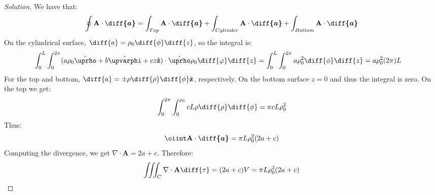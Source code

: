 \documentclass[crop=false,class=article,oneside]{standalone}
\begin{document}
        \begin{proof}[Solution]
            We have that:
            \begin{equation*}
                \oint\mathbf{A}\cdot\boldsymbol{\diff{a}}
                =\int_{Top}\mathbf{A}\cdot\boldsymbol{\diff{a}}
                +\int_{Cylinder}\mathbf{A}\cdot\boldsymbol{\diff{a}}
                +\int_{Bottom}\mathbf{A}\cdot\boldsymbol{\diff{a}}
            \end{equation*}
            On the cylindrical surface, 
            $\diff{a}=\rho_{0}\diff{\phi}\diff{z}$,
            so the integral is:
            \begin{align*}
                \int_{0}^{L}\int_{0}^{2\pi}
                (a\rho_0\hat{\boldsymbol{\uprho}}
                 +b\hat{\boldsymbol{\upvarphi}}
                 +cz\hat{\mathbf{z}})
                \cdot\hat{\boldsymbol{\uprho}}\rho_{0}
                \diff{\varphi}\diff{z}
                &=\int_{0}^{L}\int_{0}^{2\pi}a\rho_{0}^{2}
                \diff{\phi}\diff{z}
                =a\rho_0^{2}(2\pi)L    
            \end{align*}
            For the top and bottom,
            $\diff{a}%
             =\pm\rho\diff{\rho}\diff{\phi}\hat{\mathbf{z}}$,
            respectively. On the bottom surface $z=0$ and thus
            the integral is zero. On the top we get:
            \begin{equation*}
                \int_{0}^{2\pi}\int_{0}^{\rho_0}
                cL\rho\diff{\rho}\diff{\phi}
                =\pi cL\rho_0^{2}
            \end{equation*}
            Thus:
            \begin{equation*}
                \oiint\mathbf{A}\cdot\boldsymbol{\diff{a}}
                =\pi{L}\rho_0^{2}(2a+c)
            \end{equation*}
            Computing the divergence, we get
            $\nabla\cdot\mathbf{A}=2a+c$. Therefore:
            \begin{equation*}
                \iiint_C\nabla\cdot\mathbf{A}\diff{\tau}
                =(2a+c)V=\pi{L}\rho_{0}^{2}(2a+c)
            \end{equation*}
        \end{proof}
\end{document}
